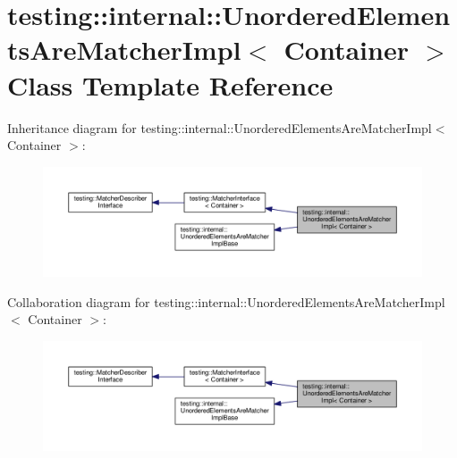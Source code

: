 \hypertarget{classtesting_1_1internal_1_1_unordered_elements_are_matcher_impl}{}\section{testing\+:\+:internal\+:\+:Unordered\+Elements\+Are\+Matcher\+Impl$<$ Container $>$ Class Template Reference}
\label{classtesting_1_1internal_1_1_unordered_elements_are_matcher_impl}


Inheritance diagram for testing\+:\+:internal\+:\+:Unordered\+Elements\+Are\+Matcher\+Impl$<$ Container $>$\+:
\nopagebreak
\begin{figure}[H]
\begin{center}
\leavevmode
\includegraphics[width=350pt]{classtesting_1_1internal_1_1_unordered_elements_are_matcher_impl__inherit__graph}
\end{center}
\end{figure}


Collaboration diagram for testing\+:\+:internal\+:\+:Unordered\+Elements\+Are\+Matcher\+Impl$<$ Container $>$\+:
\nopagebreak
\begin{figure}[H]
\begin{center}
\leavevmode
\includegraphics[width=350pt]{classtesting_1_1internal_1_1_unordered_elements_are_matcher_impl__coll__graph}
\end{center}
\end{figure}
